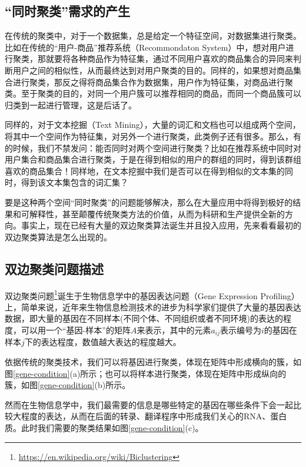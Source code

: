 \subsection{“同时聚类”需求的产生}
在传统的聚类中，对于一个数据集，总是给定一个特征空间，对数据集进行聚类。比如在传统的“用户-商品”推荐系统（Recommondaton System）中，想对用户进行聚类，那就要将各种商品作为特征集，通过不同用户喜欢的商品集合的异同来判断用户之间的相似性，从而最终达到对用户聚类的目的。同样的，如果想对商品集合进行聚类，那反之得将商品集合作为数据集，用户作为特征集，对商品进行聚类。至于聚类的目的，对同一个用户簇可以推荐相同的商品，而同一个商品簇可以归类到一起进行管理，这是后话了。

同样的，对于文本挖掘（Text Mining），大量的词汇和文档也可以组成两个空间，将其中一个空间作为特征集，对另外一个进行聚类，此类例子还有很多。那么，有的时候，我们不禁发问：能否同时对两个空间进行聚类？比如在推荐系统中同时对用户集合和商品集合进行聚类，于是在得到相似的用户的群组的同时，得到该群组喜欢的商品集合！同样地，在文本挖掘中我们是否可以在得到相似的文本集的同时，得到该文本集包含的词汇集？

要是这种两个空间“同时聚类”的问题能够解决，那么在大量应用中将得到极好的结果和可解释性，甚至颠覆传统聚类方法的价值，从而为科研和生产提供全新的方向。事实上，现在已经有大量的双边聚类算法诞生并且投入应用，先来看看最初的双边聚类算法是怎么出现的。

\subsection{双边聚类问题描述}
双边聚类问题\footnote{\url{https://en.wikipedia.org/wiki/Biclustering}}诞生于生物信息学中的基因表达问题（Gene Expression Profiling）上，简单来说，近年来生物信息检测技术的进步为科学家们提供了大量的基因表达数据，即大量的基因在不同样本(不同个体、不同组织或者不同环境)的表达的程度，可以用一个“基因-样本”的矩阵$A$来表示，其中的元素$a_{ij}$表示编号为$i$的基因在样本$j$下的表达程度，数值越大表达的程度越大。

依据传统的聚类技术，我们可以将基因进行聚类，体现在矩阵中形成横向的簇，如图\ref{gene-condition}(a)所示；也可以将样本进行聚类，体现在矩阵中形成纵向的簇，如图\ref{gene-condition}(b)所示。


然而在生物信息学中，我们最需要的信息是哪些特定的基因在哪些条件下会一起比较大程度的表达，从而在后面的转录、翻译程序中形成我们关心的RNA、蛋白质。此时我们需要的聚类结果如图\ref{gene-condition}(c)。

